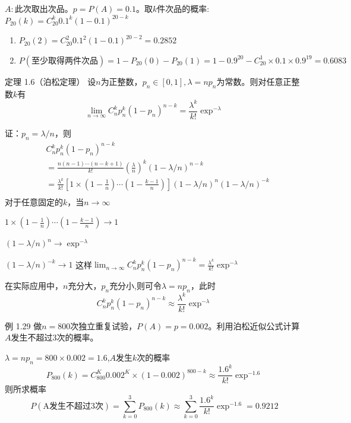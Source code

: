 \documentclass{beamer}
\begin{document}
	\begin{frame}
		$A:\text{此次取出次品}$。$p = P(A) = 0.1$。取$k$件次品的概率:$P_{20}(k) = C_{20}^k 0.1 ^ k (1 - 0.1) ^ {20 - k}$
		\begin{enumerate}
			\item $P_{20}(2) = C_{20}^2 0.1 ^ 2 (1 - 0.1) ^ {20 - 2} = 0.2852$
			\item $P(\text{至少取得两件次品}) = 1 - P_{20}(0) - P_{20}(1) = 1 - 0.9^{20} - C_{20}^1 \times 0.1 \times 0.9 ^ {19} = 0.6083$
		\end{enumerate}
	\end{frame}
	
	\begin{frame}
		定理 1.6（泊松定理） 设$n$为正整数，$p_n \in [0, 1], \lambda = np_n$为常数。则对任意正整数$k$有
		\[
		\lim_{n \rightarrow \infty} C_n^k p_n^k(1 - p_n)^{n - k} = \frac{\lambda ^ k}{k!}\exp ^{ -\lambda}
		\] 
	\end{frame}
	
	\begin{frame}
		证：$p_n = \lambda / n$，则
		\begin{align}
			&C_n^k p_n^k(1 - p_n)^{n - k} \\
			& = \frac{n(n - 1)\cdots(n - k + 1)}{k!}(\frac{\lambda}{n}) ^ k ( 1 - \lambda / n) ^ {n - k} \\
			& = \frac{\lambda^k}{k!}\left[1\times (1 - \frac{1}{n}) \cdots( 1 - \frac{k - 1}{n})\right](1 - \lambda / n) ^ n( 1 - \lambda / n) ^ {-k} \\
		\end{align}
		对于任意固定的$k$，当$n \rightarrow \infty$
		
		$1\times (1 - \frac{1}{n}) \cdots( 1 - \frac{k - 1}{n}) \rightarrow 1$
		
		$(1 - \lambda / n) ^ n \rightarrow \exp ^ {-\lambda}$
		
		$( 1 - \lambda / n) ^ {-k} \rightarrow 1$
		这样$\lim_{n \rightarrow \infty} C_n^k p_n^k(1 - p_n)^{n - k} = \frac{\lambda ^ k}{k!}\exp ^{ -\lambda}$
	\end{frame}
	
	\begin{frame}
		在实际应用中，$n$充分大，$p_n$充分小,则可令$\lambda = np_n$，此时
		\[
		C_n^k p_n^k(1 - p_n)^{n - k} \approx \frac{\lambda ^ k}{k!}\exp ^{ -\lambda}
		\]
		
		例 1.29 做$n = 800$次独立重复试验，$P(A) = p = 0.002$。利用泊松近似公式计算$A$发生不超过3次的概率。
		
		\vspace*{1cm}
		$\lambda = np_n = 800 \times 0.002 = 1.6$,$A$发生$k$次的概率
		\[
		P_{800}(k) = C_{800}^K0.002^K\times(1 - 0.002)^{800 - k} \approx \frac{1.6^k}{k!}\exp ^{-1.6}
		\]
		则所求概率
		\[
		P(\text{A发生不超过3次}) = \sum_{k = 0}^{3}P_{800}(k) \approx \sum_{k = 0}^{3}\frac{1.6^k}{k!}\exp ^{-1.6} = 0.9212
		\]
	\end{frame}
\end{document}
